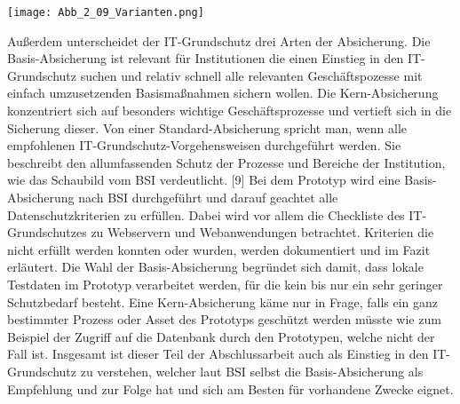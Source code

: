 \texttt{[image: Abb\_2\_09\_Varianten.png]}

Außerdem unterscheidet der IT-Grundschutz drei Arten der Absicherung. Die Basis-Absicherung ist relevant für Institutionen die einen Einstieg in den IT-Grundschutz suchen und relativ schnell alle relevanten Geschäftspozesse mit einfach umzusetzenden Basismaßnahmen sichern wollen. Die Kern-Absicherung konzentriert sich auf besonders wichtige Geschäftsprozesse und vertieft sich in die Sicherung dieser. Von einer Standard-Absicherung spricht man, wenn alle empfohlenen IT-Grundschutz-Vorgehensweisen durchgeführt werden. Sie beschreibt den allumfassenden Schutz der Prozesse und Bereiche der Institution, wie das Schaubild vom BSI verdeutlicht. [9] Bei dem Prototyp wird eine Basis-Absicherung nach BSI durchgeführt und darauf geachtet alle Datenschutzkriterien zu erfüllen. Dabei wird vor allem die Checkliste des IT-Grundschutzes zu Webservern und Webanwendungen betrachtet. Kriterien die nicht erfüllt werden konnten oder wurden, werden dokumentiert und im Fazit erläutert. Die Wahl der Basis-Absicherung begründet sich damit, dass lokale Testdaten im Prototyp verarbeitet werden, für die kein bis nur ein sehr geringer Schutzbedarf besteht. Eine Kern-Absicherung käme nur in Frage, falls ein ganz bestimmter Prozess oder Asset des Prototyps geschützt werden müsste wie zum Beispiel der Zugriff auf die Datenbank durch den Prototypen, welche nicht der Fall ist. Insgesamt ist dieser Teil der Abschlussarbeit auch als Einstieg in den IT-Grundschutz zu verstehen, welcher laut BSI selbst die Basis-Absicherung als Empfehlung und zur Folge hat und sich am Besten für vorhandene Zwecke eignet.

